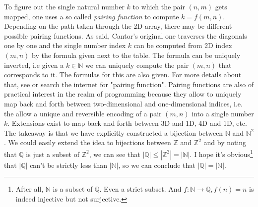 To figure out the single natural number $k$ to which the pair $(n,m)$ gets mapped, one uses a so called \emph{pairing function} to compute $k = f(m,n)$. Depending on the path taken through the 2D array, there may be different possible pairing functions. As said, Cantor's original one traverses the diagonals one by one and the single number index $k$ can be computed from 2D index $(m,n)$ by the formula given next to the table. The formula can be uniquely inverted, i.e given a $k \in \mathbb{N}$ we can uniquely compute the pair $(m,n)$ that corresponds to it. The formulas for this are also given. For more details about that, see \cite{WK_PairingFunction} or search the internet for "pairing function". Pairing functions are also of practical interest in the realm of programming because they allow to uniquely map back and forth between two-dimensional and one-dimensional indices, i.e. the allow a unique and reversible encoding of a pair $(m,n)$ into a single number $k$. Extensions exist to map back and forth between 3D and 1D, 4D and 1D, etc. The takeaway is that we have explicitly constructed a bijection between $\mathbb{N}$ and $\mathbb{N}^2$. We could easily extend the idea to bijections between $\mathbb{Z}$ and $\mathbb{Z}^2$ and by noting that $\mathbb{Q}$ is just a subset of $\mathbb{Z}^2$, we can see that $|\mathbb{Q}| \leq |\mathbb{Z}^2| = |\mathbb{N}|$. I hope it's obvious\footnote{After all, $\mathbb{N}$ is a subset of $\mathbb{Q}$. Even a strict subset. And $f: \mathbb{N} \rightarrow \mathbb{Q}, f(n) = n$ is indeed injective but not surjective.} that $|\mathbb{Q}|$ can't be strictly less than $|\mathbb{N}|$, so we can conclude that $|\mathbb{Q}| = |\mathbb{N}|$. %


